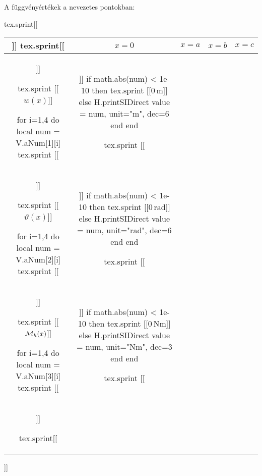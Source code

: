 A függvényértékek a nevezetes pontokban:
\begin{center}
\def\arraystretch{1.5}
\begin{luacode*}
  tex.sprint[[\begin{tabular}{c|cccc|}]]
  tex.sprint[[& $x = 0$ & $x = a$ & $x = b$ & $x = c$ \\\hline]]

  tex.sprint [[$w(x)$]]

  for i=1,4 do
    local num = V.aNum[1][i]
    tex.sprint [[&]]
    if math.abs(num) < 1e-10 then
      tex.sprint [[$0\,\mathrm{m}$]]
    else
      H.printSIDirect { value = num, unit="m", dec=6 }
    end
  end

  tex.sprint [[\\]]

  tex.sprint [[$\vartheta(x)$]]

  for i=1,4 do
    local num = V.aNum[2][i]
    tex.sprint [[&]]
    if math.abs(num) < 1e-10 then
      tex.sprint [[$0\,\mathrm{rad}$]]
    else
      H.printSIDirect { value = num, unit="rad", dec=6 }
    end
  end

  tex.sprint [[\\]]

  tex.sprint [[$\mathcal{M}_h(x)$]]

  for i=1,4 do
    local num = V.aNum[3][i]
    tex.sprint [[&]]
    if math.abs(num) < 1e-10 then
      tex.sprint [[$0\,\mathrm{Nm}$]]
    else
      H.printSIDirect { value = num, unit="Nm", dec=3 }
    end
  end

  tex.sprint [[\\\hline]]

  tex.sprint[[\end{tabular}]]
\end{luacode*}
\end{center}
